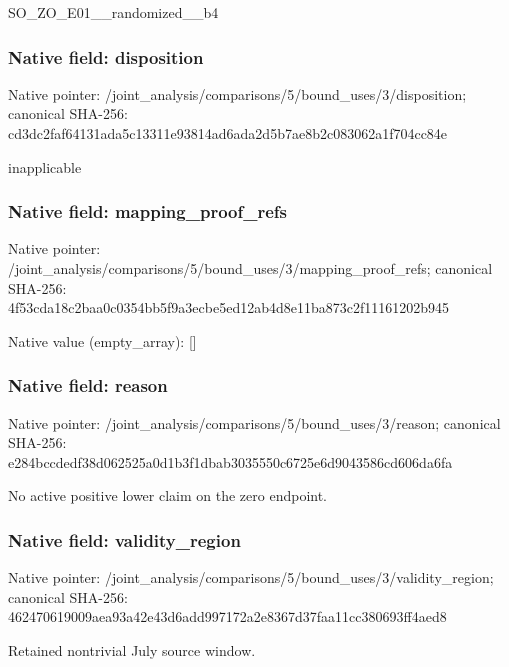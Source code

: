\documentclass[10pt,a4paper]{article}
\begin{document}
\begingroup\raggedright\sloppy SO\_\allowbreak{}ZO\_\allowbreak{}E01\_\allowbreak{}\_\allowbreak{}randomized\_\allowbreak{}\_\allowbreak{}b4\par\endgroup

\subsubsection{Native field: disposition}
Native pointer: /joint\_\allowbreak{}analysis/comparisons/5/bound\_\allowbreak{}uses/3/disposition; canonical SHA-256: cd3dc2faf64131ada5c13311e93814ad6ada2d5b7ae8b2c083062a1f704cc84e

\begingroup\raggedright\sloppy inapplicable\par\endgroup

\subsubsection{Native field: mapping\_\allowbreak{}proof\_\allowbreak{}refs}
Native pointer: /joint\_\allowbreak{}analysis/comparisons/5/bound\_\allowbreak{}uses/3/mapping\_\allowbreak{}proof\_\allowbreak{}refs; canonical SHA-256: 4f53cda18c2baa0c0354bb5f9a3ecbe5ed12ab4d8e11ba873c2f11161202b945

Native value (empty\_\allowbreak{}array): []

\subsubsection{Native field: reason}
Native pointer: /joint\_\allowbreak{}analysis/comparisons/5/bound\_\allowbreak{}uses/3/reason; canonical SHA-256: e284bccdedf38d062525a0d1b3f1dbab3035550c6725e6d9043586cd606da6fa

\begingroup\raggedright\sloppy No active positive lower claim on the zero endpoint.\par\endgroup

\subsubsection{Native field: validity\_\allowbreak{}region}
Native pointer: /joint\_\allowbreak{}analysis/comparisons/5/bound\_\allowbreak{}uses/3/validity\_\allowbreak{}region; canonical SHA-256: 462470619009aea93a42e43d6add997172a2e8367d37faa11cc380693ff4aed8

\begingroup\raggedright\sloppy Retained nontrivial July source window.\par\endgroup
\end{document}
